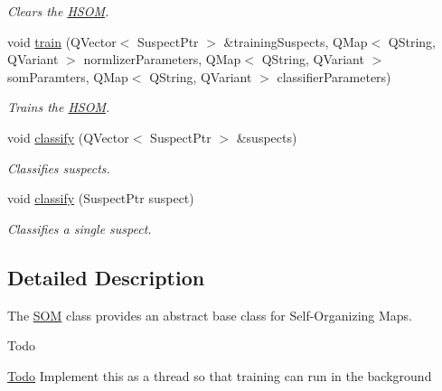 \begin{DoxyCompactItemize}
\begin{DoxyCompactList}\small\item\em \-Clears the \hyperlink{classhsom_1_1_h_s_o_m}{\-H\-S\-O\-M}. \end{DoxyCompactList}\item 
void \hyperlink{classhsom_1_1_h_s_o_m_a1c7d16d551f08ee274fe8a9ebe5debda}{train} (\-Q\-Vector$<$ \-Suspect\-Ptr $>$ \&training\-Suspects, \-Q\-Map$<$ \-Q\-String, \-Q\-Variant $>$ normlizer\-Parameters, \-Q\-Map$<$ \-Q\-String, \-Q\-Variant $>$ som\-Paramters, \-Q\-Map$<$ \-Q\-String, \-Q\-Variant $>$ classifier\-Parameters)
\begin{DoxyCompactList}\small\item\em \-Trains the \hyperlink{classhsom_1_1_h_s_o_m}{\-H\-S\-O\-M}. \end{DoxyCompactList}\item 
void \hyperlink{classhsom_1_1_h_s_o_m_a5aca4d2c55beab117f090a6f2a43197c}{classify} (\-Q\-Vector$<$ \-Suspect\-Ptr $>$ \&suspects)
\begin{DoxyCompactList}\small\item\em \-Classifies suspects. \end{DoxyCompactList}\item 
void \hyperlink{classhsom_1_1_h_s_o_m_a9e5eebef993a09bb3e2702259fc1a140}{classify} (\-Suspect\-Ptr suspect)
\begin{DoxyCompactList}\small\item\em \-Classifies a single suspect. \end{DoxyCompactList}\end{DoxyCompactItemize}


\subsection{\-Detailed \-Description}
\-The \hyperlink{classhsom_1_1_s_o_m}{\-S\-O\-M} class provides an abstract base class for \-Self-\/\-Organizing \-Maps. 

\begin{DoxyRefDesc}{\-Todo}
\item[\hyperlink{todo__todo000014}{\-Todo}]\-Implement this as a thread so that training can run in the background \end{DoxyRefDesc}



